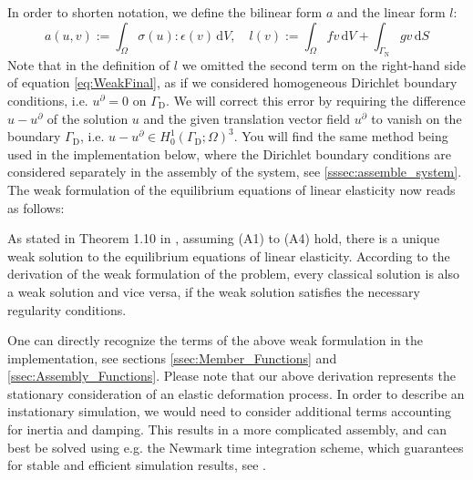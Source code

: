 \documentclass[a4paper, 11pt, twoside]{article}
\theoremstyle{plain}
\theoremstyle{definition}
\newcommand{\dd}{\,\mathrm{d}}
\begin{document}
In order to shorten notation, we define the bilinear form $a$ and the linear form $l$:
\begin{equation}
	a(u,v) := \int_\Omega \sigma(u) : \epsilon(v) \dd V, \quad
	l(v) := \int_\Omega f v \dd V + \int_{\Gamma_\text{N}} g v \dd S
\end{equation}
Note that in the definition of $l$ we omitted the second term on the right-hand side of equation \eqref{eq:WeakFinal}, as if we considered homogeneous Dirichlet boundary conditions, i.e. $u^\partial = 0$ on $\Gamma_\text{D}$.
We will correct this error by requiring the difference $u-u^\partial$ of the solution $u$ and the given translation vector field $u^\partial$ to vanish on the boundary $\Gamma_\text{D}$, i.e. $u-u^\partial \in H_0^1(\Gamma_\text{D};\Omega)^3$.
You will find the same method being used in the implementation below, where the Dirichlet boundary conditions are considered separately in the assembly of the system, see \ref{sssec:assemble_system}.
The weak formulation of the equilibrium equations of linear elasticity now reads as follows:
\begin{center}\end{center}
As stated in Theorem 1.10 in \cite{rannacher}, assuming (A1) to (A4) hold, there is a unique weak solution to the equilibrium equations of linear elasticity.
According to the derivation of the weak formulation of the problem, every classical solution is also a weak solution and vice versa, if the weak solution satisfies the necessary regularity conditions.

One can directly recognize the terms of the above weak formulation in the implementation, see sections \ref{ssec:Member_Functions} and \ref{ssec:Assembly_Functions}.
Please note that our above derivation represents the stationary consideration of an elastic deformation process. 
In order to describe an instationary simulation, we would need to consider additional terms accounting for inertia and damping. 
This results in a more complicated assembly, and can best be solved using e.g. the Newmark time integration scheme, which guarantees for stable and efficient simulation results, see \cite{bathe}.
\end{document}
